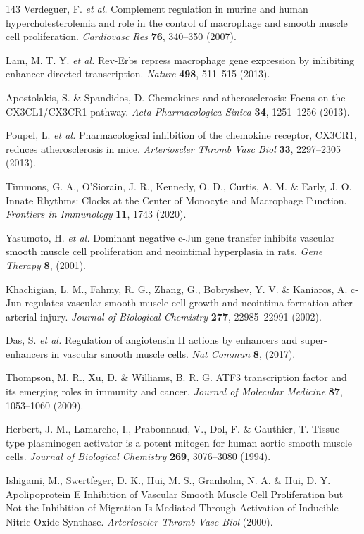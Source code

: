 \documentclass[12pt]{article}
\begin{document}
\begin{thebibliography}{143}
 Verdeguer, F. \textit{et al.} Complement regulation in murine and human hypercholesterolemia and role in the control of macrophage and smooth muscle cell proliferation. \textit{Cardiovasc Res} \textbf{76}, 340--350 (2007).

 Lam, M. T. Y. \textit{et al.} Rev-Erbs repress macrophage gene expression by inhibiting enhancer-directed transcription. \textit{Nature} \textbf{498}, 511--515 (2013).

 Apostolakis, S. \& Spandidos, D. Chemokines and atherosclerosis: Focus on the CX3CL1/CX3CR1 pathway. \textit{Acta Pharmacologica Sinica} \textbf{34}, 1251--1256 (2013).

 Poupel, L. \textit{et al.} Pharmacological inhibition of the chemokine receptor, CX3CR1, reduces atherosclerosis in mice. \textit{Arterioscler Thromb Vasc Biol} \textbf{33}, 2297--2305 (2013).

 Timmons, G. A., O'Siorain, J. R., Kennedy, O. D., Curtis, A. M. \& Early, J. O. Innate Rhythms: Clocks at the Center of Monocyte and Macrophage Function. \textit{Frontiers in Immunology} \textbf{11}, 1743 (2020).

 Yasumoto, H. \textit{et al.} Dominant negative c-Jun gene transfer inhibits vascular smooth muscle cell proliferation and neointimal hyperplasia in rats. \textit{Gene Therapy} \textbf{8}, (2001).

 Khachigian, L. M., Fahmy, R. G., Zhang, G., Bobryshev, Y. V. \& Kaniaros, A. c-Jun regulates vascular smooth muscle cell growth and neointima formation after arterial injury. \textit{Journal of Biological Chemistry} \textbf{277}, 22985--22991 (2002).

 Das, S. \textit{et al.} Regulation of angiotensin II actions by enhancers and super-enhancers in vascular smooth muscle cells. \textit{Nat Commun} \textbf{8}, (2017).

 Thompson, M. R., Xu, D. \& Williams, B. R. G. ATF3 transcription factor and its emerging roles in immunity and cancer. \textit{Journal of Molecular Medicine} \textbf{87}, 1053--1060 (2009).

 Herbert, J. M., Lamarche, I., Prabonnaud, V., Dol, F. \& Gauthier, T. Tissue-type plasminogen activator is a potent mitogen for human aortic smooth muscle cells. \textit{Journal of Biological Chemistry} \textbf{269}, 3076--3080 (1994).

 Ishigami, M., Swertfeger, D. K., Hui, M. S., Granholm, N. A. \& Hui, D. Y. Apolipoprotein E Inhibition of Vascular Smooth Muscle Cell Proliferation but Not the Inhibition of Migration Is Mediated Through Activation of Inducible Nitric Oxide Synthase. \textit{Arterioscler Thromb Vasc Biol} (2000).


\end{thebibliography}
\end{document}
